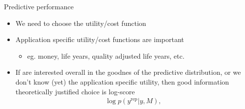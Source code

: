 \documentclass[english,t]{beamer}
\newenvironment{list1}{
   \begin{list}{$\color{list1}\bullet$}{\itemsep=6pt}}{
  \end{list}}
\newenvironment{list2}{
  \begin{list}{-}{\baselineskip=12pt\itemsep=2pt}}{
  \end{list}}
\begin{document}


  

\begin{frame}
  
  {\Large\color{navyblue} Predictive performance}

  \begin{itemize}
  \item We need to choose the utility/cost function
  \item Application specific utility/cost functions are important
    \begin{itemize}
      \item eg. money, life years, quality adjusted life years, etc.
    \end{itemize}
    \pause
  \item If are interested overall in the goodnes of the predictive distribution,
    or we don't know (yet) the application specific utility, then
    good information theoretically justified choice is log-score
      \begin{align*}
        \log p(y^{\text{rep}} | y, M),
      \end{align*}
\end{itemize}

\end{frame}
\end{document}

